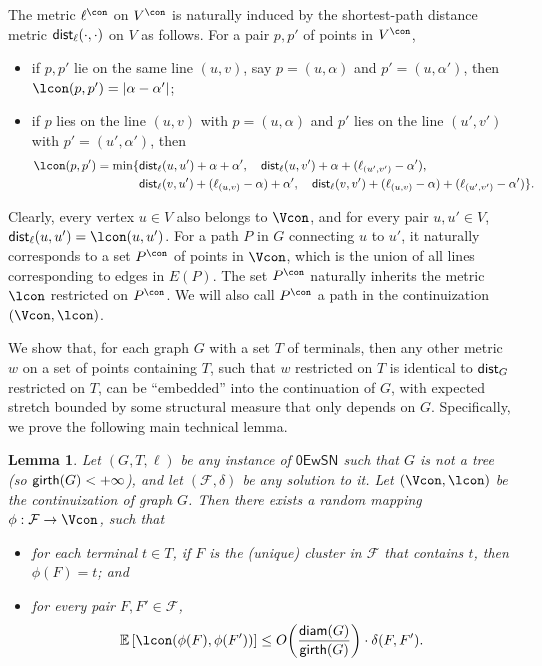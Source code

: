 \documentclass[11pt]{article}
\newtheorem{lemma}[theorem]{Lemma}
\theoremstyle{definition}
\newcommand{\fset}{{\mathcal{F}}}
\newcommand{\diam}{\textnormal{\textsf{diam}}}
\newcommand{\dist}{\textnormal{\textsf{dist}}}
\newcommand{\gir}{\textnormal{\textsf{girth}}}
\def\ex#1{{\mathbb{E}}\left[ #1 \right]}
\newcommand{\zesn}{\mathsf{0EwSN}}
\begin{document}
The metric $\ell^{\con}$ on $V^{\con}$ is naturally induced by the shortest-path distance metric $\dist_{\ell}(\cdot,\cdot)$ on $V$ as follows.
For a pair $p,p'$ of points in $V^{\con}$, 
\begin{itemize}
\item if $p,p'$ lie on the same line $(u,v)$, say $p=(u,\alpha)$ and $p'=(u,\alpha')$, then $\lcon(p,p')=|\alpha-\alpha'|$;
\item if $p$ lies on the line $(u,v)$ with $p=(u,\alpha)$ and $p'$ lies on the line $(u',v')$ with $p'=(u',\alpha')$, then 
\[
\begin{split}
\lcon(p,p')=\min\{
&  \dist_{\ell}(u,u')+\alpha+\alpha', \quad
	\dist_{\ell}(u,v')+\alpha+(\ell_{(u',v')}-\alpha'),\\
&	\dist_{\ell}(v,u')+(\ell_{(u,v)}-\alpha)+\alpha', \quad
	\dist_{\ell}(v,v')+(\ell_{(u,v)}-\alpha)+(\ell_{(u',v')}-\alpha')
\}.
\end{split}
\]
\end{itemize}
Clearly, every vertex $u\in V$ also belongs to $\Vcon$, and for every pair $u,u'\in V$, $\dist_{\ell}(u,u')=\lcon(u,u')$.
For a path $P$ in $G$ connecting $u$ to $u'$, it naturally corresponds to a set $P^{\con}$ of points in $\Vcon$, which is the union of all lines corresponding to edges in $E(P)$. The set $P^{\con}$ naturally inherits the metric $\lcon$ restricted on $P^{\con}$. We will also call $P^{\con}$ a path in the continuization $(\Vcon,\lcon)$.

We show that, for each graph $G$ with a set $T$ of terminals, then any other metric $w$ on a set of points containing $T$, such that $w$ restricted on $T$ is identical to $\dist_{G}$ restricted on $T$, can be ``embedded'' into the continuation of $G$, with expected stretch bounded by some structural measure that only depends on $G$. 
Specifically, we prove the following main technical lemma.


\begin{lemma} \label{lem:d-g}
Let $(G,T,\ell)$ be any instance of $\zesn$ such that $G$ is not a tree (so $\gir(G)<+\infty$), and let $(\fset,\delta)$ be any solution to it. Let $(\Vcon,\lcon)$ be the continuization of graph $G$.
Then there exists a random mapping $\phi: \fset \to \Vcon$, such that
\begin{itemize}
\item for each terminal $t\in T$, if $F$ is the (unique) cluster in $\fset$ that contains $t$, then $\phi(F)=t$; and
\item for every pair $F,F'\in \fset$,
$$\ex{\lcon(\phi(F),\phi(F'))} \le O\bigg(\frac{\diam(G)}{\gir(G)}\bigg)\cdot  \delta(F,F').$$
\end{itemize}
\end{lemma}
\end{document}
